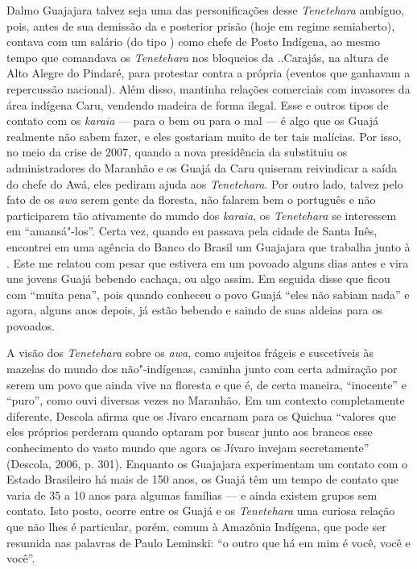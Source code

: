 Dalmo Guajajara talvez seja uma das personificações desse
\emph{Tenetehara} ambíguo, pois, antes de sua demissão da  e
posterior prisão (hoje em regime semiaberto), contava com um salário (do
tipo ) como chefe de Posto Indígena, ao mesmo tempo que comandava os
\emph{Tenetehara} nos bloqueios da ..Carajás, na altura de Alto Alegre
do Pindaré, para protestar contra a própria  (eventos que ganhavam
a repercussão nacional). Além disso, mantinha relações comerciais com
invasores da área indígena Caru, vendendo madeira de forma ilegal. Esse
e outros tipos de contato com os \emph{karaia} --- para o bem ou para o
mal --- é algo que os Guajá realmente não sabem fazer, e eles gostariam
muito de ter tais malícias. Por isso, no meio da crise de 2007, quando a
nova presidência da  substituiu os administradores do Maranhão e os
Guajá da  Caru quiseram reivindicar a saída do chefe do  Awá, eles
pediram ajuda aos \emph{Tenetehara}. Por outro lado, talvez pelo fato de
os \emph{awa} serem gente da floresta, não falarem bem o português e não
participarem tão ativamente do mundo dos \emph{karaia}, os
\emph{Tenetehara} se interessem em ``amansá"-los''. Certa vez, quando eu
passava pela cidade de Santa Inês, encontrei em uma agência do Banco do
Brasil um Guajajara que trabalha junto à . Este me relatou com
pesar que estivera em um povoado alguns dias antes e vira uns jovens
Guajá bebendo cachaça, ou algo assim. Em seguida disse que ficou com
``muita pena'', pois quando conheceu o povo Guajá ``eles não sabiam nada'' e
agora, alguns anos depois, já estão bebendo e saindo de suas aldeias
para os povoados.

A visão dos \emph{Tenetehara} sobre os \emph{awa}, como sujeitos frágeis
e suscetíveis às mazelas do mundo dos não"-indígenas, caminha junto com
certa admiração por serem um povo que ainda vive na floresta e que é, de
certa maneira, ``inocente'' e ``puro'', como ouvi diversas vezes no
Maranhão. Em um contexto completamente diferente, Descola afirma que os
Jívaro encarnam para os Quichua ``valores que eles próprios perderam
quando optaram por buscar junto aos brancos esse conhecimento do vasto
mundo que agora os Jívaro invejam secretamente'' (Descola, 2006, p. 301).
Enquanto os Guajajara experimentam um contato com o Estado Brasileiro há
mais de 150 anos, os Guajá têm um tempo de contato que varia de 35 a 10
anos para algumas famílias --- e ainda existem grupos sem contato. Isto
posto, ocorre entre os Guajá e os \emph{Tenetehara} uma curiosa relação
que não lhes é particular, porém, comum à Amazônia Indígena, que pode
ser resumida nas palavras de Paulo Leminski: ``o outro que há em mim é
você, você e você''.

